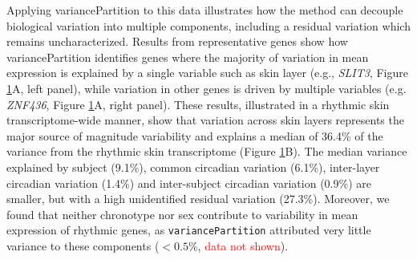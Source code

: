 {\begin{figure}[!]
\begin{center}
		\label{fig:fig2}
	\end{center}
\end{figure}
Applying variancePartition to this data illustrates how the method can decouple biological variation into multiple components, including a residual variation which remains uncharacterized. Results from representative genes show how variancePartition identifies genes where the majority of variation in mean expression is explained by a single variable such as skin layer (e.g., \textit{SLIT3}, Figure \ref{fig:fig2}A, left panel), while variation in other genes is driven by multiple variables (e.g. \textit{ZNF436}, Figure \ref{fig:fig2}A, right panel). These results, illustrated in a rhythmic skin transcriptome-wide manner, show that variation across skin layers represents the major source of magnitude variability and explains a median of 36.4\% of the variance from the rhythmic skin transcriptome (Figure \ref{fig:fig2}B). The median variance explained by subject (9.1\%), common circadian variation (6.1\%), inter-layer circadian variation (1.4\%) and inter-subject circadian variation (0.9\%) are smaller, but with a high unidentified residual variation (27.3\%). Moreover, we found that neither chronotype nor sex contribute to variability in mean expression of rhythmic genes, as \texttt{variancePartition} attributed very little variance to these components ($<0.5$\%, \textcolor{red}{data not shown}). \\

}
